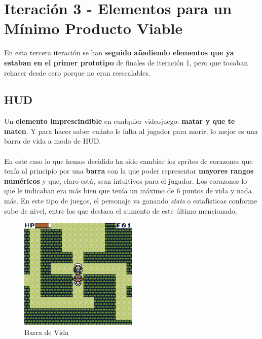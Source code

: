 \clearpage

\section{Iteración 3 - Elementos para un Mínimo Producto Viable}

En esta tercera iteración se han \textbf{seguido añadiendo elementos que ya estaban en el primer prototipo} de finales de iteración 1, pero que tocaban rehacer desde cero porque no eran reescalables.

\subsection{HUD}

Un \textbf{elemento imprescindible} en cualquier videojuego: \textbf{matar y que te maten}. Y para hacer saber cuánto le falta al jugador para morir, lo mejor es una barra de vida a modo de HUD.
\\ \\
En este caso lo que hemos decidido ha sido cambiar los sprites de corazones que tenía al principio por una \textbf{barra} con la que poder representar \textbf{mayores rangos numéricos} y que, claro está, sean intuitivos para el jugador. Los corazones lo que le indicaban era más bien que tenía un máximo de 6 puntos de vida y nada más. En este tipo de juegos, el personaje va ganando \textit{stats} o estafísticas conforme sube de nivel, entre los que destaca el aumento de este último mencionado.

\begin{figure}[h]
\centering
\includegraphics[width=0.5\textwidth]{include/images/desarrollo/lifebar.png}
\caption{Barra de Vida}
\label{figure:lifebar}
\end{figure}


